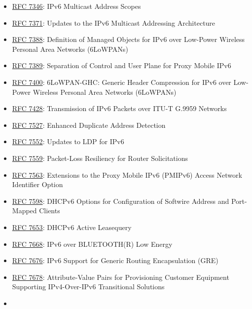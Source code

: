 \documentclass[
]{article}
\begin{document}
\begin{itemize}
  Prefix for Overlay Routable Cryptographic Hash Identifiers Version 2
  (ORCHIDv2)
\item
  \href{https://www.rfc-editor.org/info/rfc7346}{RFC 7346}: IPv6
  Multicast Address Scopes
\item
  \href{https://www.rfc-editor.org/info/rfc7371}{RFC 7371}: Updates to
  the IPv6 Multicast Addressing Architecture
\item
  \href{https://www.rfc-editor.org/info/rfc7388}{RFC 7388}: Definition
  of Managed Objects for IPv6 over Low-Power Wireless Personal Area
  Networks (6LoWPANs)
\item
  \href{https://www.rfc-editor.org/info/rfc7389}{RFC 7389}: Separation
  of Control and User Plane for Proxy Mobile IPv6
\item
  \href{https://www.rfc-editor.org/info/rfc7400}{RFC 7400}: 6LoWPAN-GHC:
  Generic Header Compression for IPv6 over Low-Power Wireless Personal
  Area Networks (6LoWPANs)
\item
  \href{https://www.rfc-editor.org/info/rfc7428}{RFC 7428}: Transmission
  of IPv6 Packets over ITU-T G.9959 Networks
\item
  \href{https://www.rfc-editor.org/info/rfc7527}{RFC 7527}: Enhanced
  Duplicate Address Detection
\item
  \href{https://www.rfc-editor.org/info/rfc7552}{RFC 7552}: Updates to
  LDP for IPv6
\item
  \href{https://www.rfc-editor.org/info/rfc7559}{RFC 7559}: Packet-Loss
  Resiliency for Router Solicitations
\item
  \href{https://www.rfc-editor.org/info/rfc7563}{RFC 7563}: Extensions
  to the Proxy Mobile IPv6 (PMIPv6) Access Network Identifier Option
\item
  \href{https://www.rfc-editor.org/info/rfc7598}{RFC 7598}: DHCPv6
  Options for Configuration of Softwire Address and Port-Mapped Clients
\item
  \href{https://www.rfc-editor.org/info/rfc7653}{RFC 7653}: DHCPv6
  Active Leasequery
\item
  \href{https://www.rfc-editor.org/info/rfc7668}{RFC 7668}: IPv6 over
  BLUETOOTH(R) Low Energy
\item
  \href{https://www.rfc-editor.org/info/rfc7676}{RFC 7676}: IPv6 Support
  for Generic Routing Encapsulation (GRE)
\item
  \href{https://www.rfc-editor.org/info/rfc7678}{RFC 7678}:
  Attribute-Value Pairs for Provisioning Customer Equipment Supporting
  IPv4-Over-IPv6 Transitional Solutions
\item

\end{itemize}
\end{document}
